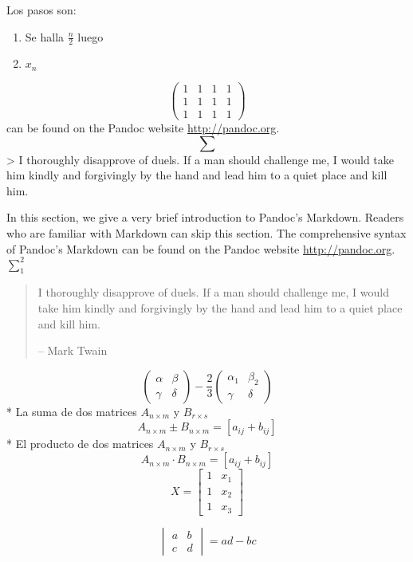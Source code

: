 \documentclass[10pt,]{krantz}
\providecommand{\tightlist}{%
  \setlength{\itemsep}{0pt}\setlength{\parskip}{0pt}}
\theoremstyle{definition}
\theoremstyle{definition}
\theoremstyle{definition}
\theoremstyle{remark}
\begin{document}
Los pasos son:

\begin{enumerate}
\def\labelenumi{\arabic{enumi}.}
\tightlist
\item
  Se halla \(\frac{n}{2}\) luego
\item
  \(x_n\)
\end{enumerate}

\[ \begin{pmatrix}
1&1&1&1\\
1&1&1&1\\
1&1&1&1
\end{pmatrix}\]
can be found on the Pandoc website \url{http://pandoc.org}.
\[\sum\]
\textgreater{} I thoroughly disapprove of duels. If a man should challenge me,
I would take him kindly and forgivingly by the hand and lead him
to a quiet place and kill him.

In this section, we give a very brief introduction to Pandoc's Markdown. Readers who are familiar with Markdown can skip this section. The comprehensive syntax of Pandoc's Markdown can be found on the Pandoc website \url{http://pandoc.org}. \(\sum_1^2\)

\begin{quote}
I thoroughly disapprove of duels. If a man should challenge me,
I would take him kindly and forgivingly by the hand and lead him
to a quiet place and kill him.

-- Mark Twain
\end{quote}

\[\begin{pmatrix}\alpha & \beta\\
\gamma & \delta
\end{pmatrix}-\frac{2}{3} \begin{pmatrix}\alpha_1 & \beta_2\\
\gamma & \delta
\end{pmatrix}\]
* La suma de dos matrices \(A_{n\times m}\) y \(B_{r\times s}\) \[A_{n\times m}\pm B_{n\times m}=[a_{ij}+b_{ij}]\]
* El producto de dos matrices \(A_{n\times m}\) y \(B_{r\times s}\) \[A_{n\times m}\cdot B_{n\times m}=[a_{ij}+b_{ij}]\]
\[X = \begin{bmatrix}1 & x_{1}\\
1 & x_{2}\\
1 & x_{3}
\end{bmatrix}\]

\[\begin{vmatrix}a & b\\
c & d
\end{vmatrix}=ad-bc\]
\end{document}
